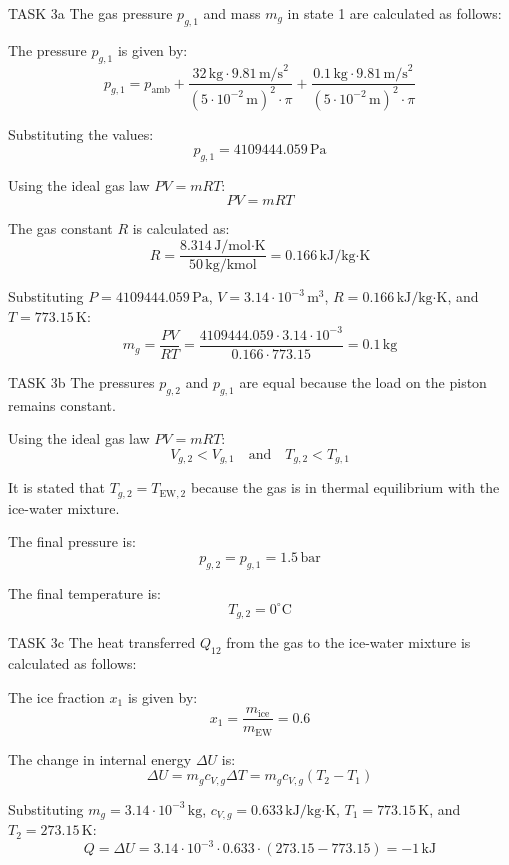 TASK 3a  
The gas pressure \( p_{g,1} \) and mass \( m_g \) in state 1 are calculated as follows:  

The pressure \( p_{g,1} \) is given by:  
\[
p_{g,1} = p_{\text{amb}} + \frac{32 \, \text{kg} \cdot 9.81 \, \text{m/s}^2}{\left(5 \cdot 10^{-2} \, \text{m}\right)^2 \cdot \pi} + \frac{0.1 \, \text{kg} \cdot 9.81 \, \text{m/s}^2}{\left(5 \cdot 10^{-2} \, \text{m}\right)^2 \cdot \pi}
\]  

Substituting the values:  
\[
p_{g,1} = 4109444.059 \, \text{Pa}
\]  

Using the ideal gas law \( PV = mRT \):  
\[
PV = mRT
\]  

The gas constant \( R \) is calculated as:  
\[
R = \frac{8.314 \, \text{J/mol·K}}{50 \, \text{kg/kmol}} = 0.166 \, \text{kJ/kg·K}
\]  

Substituting \( P = 4109444.059 \, \text{Pa} \), \( V = 3.14 \cdot 10^{-3} \, \text{m}^3 \), \( R = 0.166 \, \text{kJ/kg·K} \), and \( T = 773.15 \, \text{K} \):  
\[
m_g = \frac{PV}{RT} = \frac{4109444.059 \cdot 3.14 \cdot 10^{-3}}{0.166 \cdot 773.15} = 0.1 \, \text{kg}
\]  

TASK 3b  
The pressures \( p_{g,2} \) and \( p_{g,1} \) are equal because the load on the piston remains constant.  

Using the ideal gas law \( PV = mRT \):  
\[
V_{g,2} < V_{g,1} \quad \text{and} \quad T_{g,2} < T_{g,1}
\]  

It is stated that \( T_{g,2} = T_{\text{EW},2} \) because the gas is in thermal equilibrium with the ice-water mixture.  

The final pressure is:  
\[
p_{g,2} = p_{g,1} = 1.5 \, \text{bar}
\]  

The final temperature is:  
\[
T_{g,2} = 0^\circ\text{C}
\]  

TASK 3c  
The heat transferred \( Q_{12} \) from the gas to the ice-water mixture is calculated as follows:  

The ice fraction \( x_1 \) is given by:  
\[
x_1 = \frac{m_{\text{ice}}}{m_{\text{EW}}} = 0.6
\]  

The change in internal energy \( \Delta U \) is:  
\[
\Delta U = m_g c_{V,g} \Delta T = m_g c_{V,g} (T_2 - T_1)
\]  

Substituting \( m_g = 3.14 \cdot 10^{-3} \, \text{kg} \), \( c_{V,g} = 0.633 \, \text{kJ/kg·K} \), \( T_1 = 773.15 \, \text{K} \), and \( T_2 = 273.15 \, \text{K} \):  
\[
Q = \Delta U = 3.14 \cdot 10^{-3} \cdot 0.633 \cdot (273.15 - 773.15) = -1 \, \text{kJ}
\]  